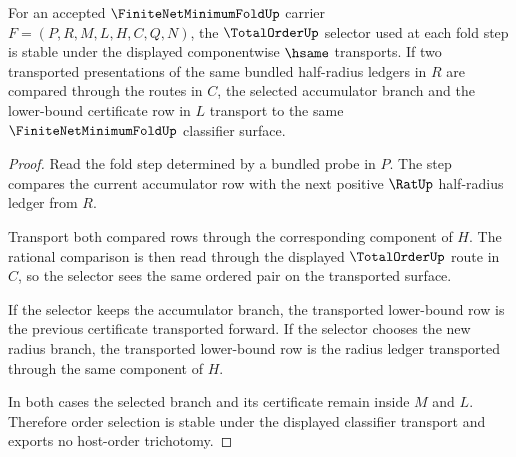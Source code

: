 \begin{theorem}
\label{thm:finitenetminimumfold-order-selector-transport}
For an accepted $\FiniteNetMinimumFoldUp$ carrier $F=(P,R,M,L,H,C,Q,N)$, the $\TotalOrderUp$ selector used at each fold step is stable under the displayed componentwise $\hsame$ transports. If two transported presentations of the same bundled half-radius ledgers in $R$ are compared through the routes in $C$, the selected accumulator branch and the lower-bound certificate row in $L$ transport to the same $\FiniteNetMinimumFoldUp$ classifier surface.
\end{theorem}
\begin{proof}
Read the fold step determined by a bundled probe in $P$. The step compares the current accumulator row with the next positive $\RatUp$ half-radius ledger from $R$.

Transport both compared rows through the corresponding component of $H$. The rational comparison is then read through the displayed $\TotalOrderUp$ route in $C$, so the selector sees the same ordered pair on the transported surface.

If the selector keeps the accumulator branch, the transported lower-bound row is the previous certificate transported forward. If the selector chooses the new radius branch, the transported lower-bound row is the radius ledger transported through the same component of $H$.

In both cases the selected branch and its certificate remain inside $M$ and $L$. Therefore order selection is stable under the displayed classifier transport and exports no host-order trichotomy.
\end{proof}

